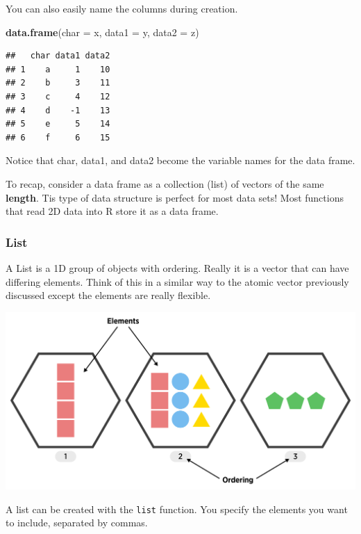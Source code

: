 \documentclass[
]{book}
\newenvironment{Shaded}{\begin{snugshade}}{\end{snugshade}}
\newcommand{\DataTypeTok}[1]{\textcolor[rgb]{0.13,0.29,0.53}{#1}}
\newcommand{\KeywordTok}[1]{\textcolor[rgb]{0.13,0.29,0.53}{\textbf{#1}}}
\newcommand{\NormalTok}[1]{#1}
\theoremstyle{definition}
\theoremstyle{definition}
\theoremstyle{definition}
\theoremstyle{remark}
\begin{document}
You can also easily name the columns during creation.

\begin{Shaded}
\begin{Highlighting}[]
\KeywordTok{data.frame}\NormalTok{(}\DataTypeTok{char =}\NormalTok{ x, }\DataTypeTok{data1 =}\NormalTok{ y, }\DataTypeTok{data2 =}\NormalTok{ z)}
\end{Highlighting}
\end{Shaded}

\begin{verbatim}
##   char data1 data2
## 1    a     1    10
## 2    b     3    11
## 3    c     4    12
## 4    d    -1    13
## 5    e     5    14
## 6    f     6    15
\end{verbatim}

Notice that char, data1, and data2 become the variable names for the data frame.

To recap, consider a data frame as a collection (list) of vectors of the same \textbf{length}. Tis type of data structure is perfect for most data sets! Most functions that read 2D data into R store it as a data frame.

\hypertarget{list-1}{%
\subsubsection{List}\label{list-1}}

A List is a 1D group of objects with ordering. Really it is a vector that can have differing elements. Think of this in a similar way to the atomic vector previously discussed except the elements are really flexible.

\begin{center}\includegraphics[width=0.8\linewidth]{img/listVisualF} \end{center}

A list can be created with the \texttt{list} function. You specify the elements you want to include, separated by commas.
\end{document}

